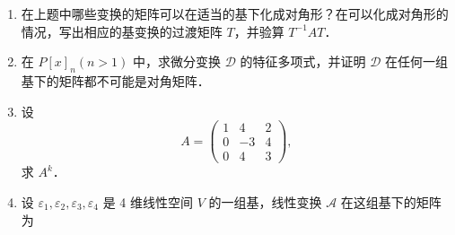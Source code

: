 \begin{enumerate}
\begin{enumerate}
  \anssub
    \item $A=\begin{pmatrix}0&a\\-a&0\end{pmatrix}$；
  \anssub
    \item $A=\begin{pmatrix}1&1&1&1\\1&1&-1&-1\\1&-1&1&-1\\1&-1&-1&1\end{pmatrix}$；
  \anssub
    \item $A=\begin{pmatrix}5&6&-3\\-1&0&1\\1&2&-1\end{pmatrix}$；
  \anssub
    \item $A=\begin{pmatrix}0&0&1\\0&1&0\\1&0&0\end{pmatrix}$；
  \anssub
    \item $A=\begin{pmatrix}0&2&1\\-2&0&3\\-1&-3&0\end{pmatrix}$；
  \anssub
    \item $A=\begin{pmatrix}3&1&0\\-4&-1&0\\4&-8&-2\end{pmatrix}$．
  \anssub
  \end{enumerate}
  \item 在上题中哪些变换的矩阵可以在适当的基下化成对角形？在可以化成对角形的情况，写出相应的基变换的过渡矩阵 $T$，并验算 $T^{-1}AT$．
  \anscompute
  \item 在 $P[x]_n(n>1)$ 中，求微分变换 $\mathcal{D}$ 的特征多项式，并证明 $\mathcal{D}$ 在任何一组基下的矩阵都不可能是对角矩阵．
  \ansproof
  \item 设
  \[
    A=\begin{pmatrix}
      1&4&2\\
      0&-3&4\\
      0&4&3
    \end{pmatrix},
  \]
  求 $A^k$．
  \anscompute
  \item 设 $\varepsilon_1,\varepsilon_2,\varepsilon_3,\varepsilon_4$ 是 4 维线性空间 $V$ 的一组基，线性变换 $\mathcal{A}$ 在这组基下的矩阵为

\end{enumerate}
